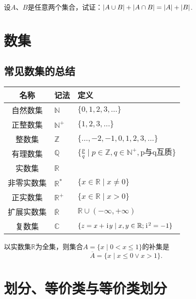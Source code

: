 \begin{example}
设\(A\)、\(B\)是任意两个集合，试证：\(\abs{A \cup B} + \abs{A \cap B} = \abs{A} + \abs{B}\).
\end{example}

\section{数集}
\subsection{常见数集的总结}
\begin{center}
\begin{tabular}{c|l|l}
\hline
名称 & 记法 & 定义 \\ \hline
自然数集 & \(\mathbb{N}\) & \(\{ 0,1,2,3,\dotsc \}\) \\
正整数集 & \(\mathbb{N}^+\) & \(\{ 1,2,3,\dotsc \}\) \\
整数集 & \(\mathbb{Z}\) & \(\{ \dotsc,-2,-1,0,1,2,3,\dotsc \}\) \\
有理数集 & \(\mathbb{Q}\) & \(\{ \frac{p}{q} \mid p \in \mathbb{Z}, q \in \mathbb{N}^+, \text{p与q互质} \}\) \\
实数集 & \(\mathbb{R}\) \\
非零实数集 & \(\mathbb{R}^*\) & \(\{ x \in \mathbb{R} \mid x \neq 0 \}\) \\
正实数集 & \(\mathbb{R}^+\) & \(\{ x \in \mathbb{R} \mid x > 0 \}\) \\
扩展实数集 & \(\overline{\mathbb{R}}\) & \(\mathbb{R} \cup (-\infty,+\infty)\) \\
复数集 & \(\mathbb{C}\) & \(\{ z = x + \kern1pt\mathrm{i}\kern1pt y \mid x,y \in \mathbb{R}; \kern1pt\mathrm{i}\kern1pt^2 = -1 \}\) \\ \hline
\end{tabular}
\end{center}

\begin{example}
以实数集\(\mathbb{R}\)为全集，则集合\(A = \{ x \mid 0 < x \leqslant 1 \}\)的补集是\[
\overline{A} = \{ x \mid x \leqslant 0 \lor x > 1 \}.
\]
\end{example}

\section{划分、等价类与等价类划分}
